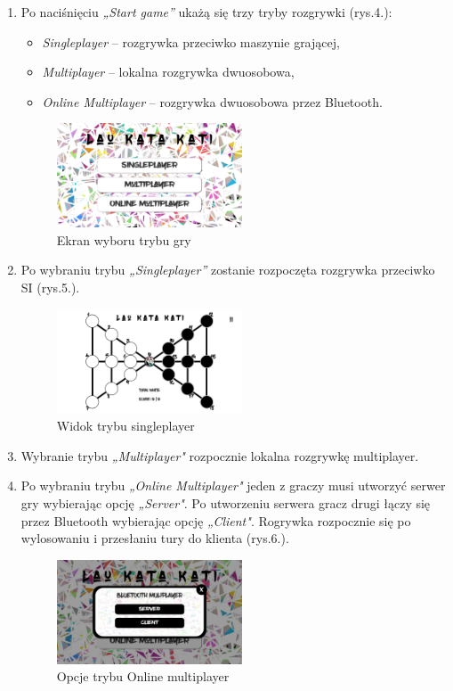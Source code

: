 \begin{enumerate}
	\item Po naciśnięciu \textit{„Start game”} ukażą się trzy tryby rozgrywki (rys.4.):
	\begin{itemize}
		\item \textit{Singleplayer} – rozgrywka przeciwko maszynie grającej,
		\item \textit{Multiplayer} – lokalna rozgrywka dwuosobowa,
		\item \textit{Online Multiplayer} – rozgrywka dwuosobowa przez Bluetooth.
	\end{itemize}
	\begin{figure}[ht!]
		\centering
		\includegraphics[width=55mm]{img/ekran_trybow.png}
		\caption{Ekran wyboru trybu gry}
	\end{figure}

	\item Po wybraniu trybu \textit{„Singleplayer”} zostanie rozpoczęta rozgrywka przeciwko SI (rys.5.).
	\begin{figure}[ht!]
		\centering
		\includegraphics[width=55mm]{img/singleplayer.png}
		\caption{Widok trybu singleplayer}
	\end{figure}

	\item Wybranie trybu \textit{„Multiplayer"} rozpocznie lokalna rozgrywkę multiplayer.
	
	\newpage
	\item Po wybraniu trybu \textit{„Online Multiplayer"} jeden z graczy musi utworzyć serwer gry wybierając opcję \textit{„Server"}. Po utworzeniu serwera gracz drugi łączy się przez Bluetooth wybierając opcję \textit{„Client"}. Rogrywka rozpocznie się po wylosowaniu i przesłaniu tury do klienta (rys.6.). 
	\begin{figure}[ht!]
		\centering
		\includegraphics[width=55mm]{img/bluetooth.png}
		\caption{Opcje trybu Online multiplayer}
	\end{figure}
\end{enumerate}